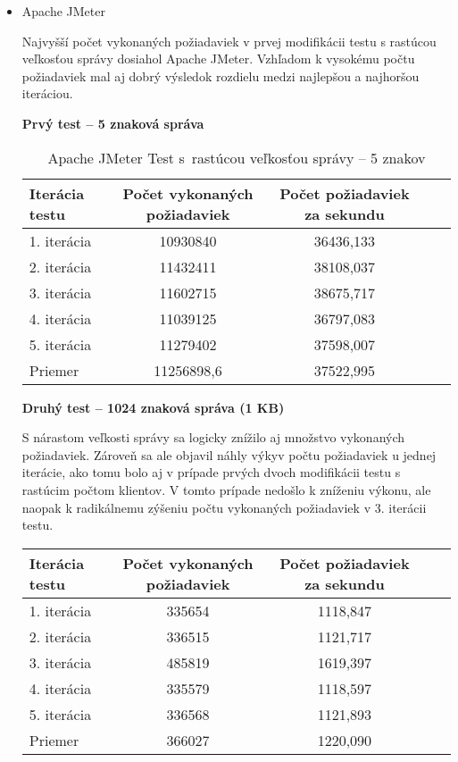 \documentclass[12pt,oneside,final]{fithesis-utf8}
\begin{document}
\begin{itemize}

\item Apache JMeter

Najvyšší počet vykonaných požiadaviek v prvej modifikácii testu s rastúcou veľkosťou správy dosiahol Apache JMeter. Vzhľadom k vysokému počtu požiadaviek mal aj dobrý výsledok rozdielu medzi najlepšou a najhoršou iteráciou.

\textbf{Prvý test -- 5 znaková správa}

\begin{table}[H]
\begin{center}
\begin{tabular}{ | l | c | c | c | c |}
		\hline
		 \textbf{Iterácia testu} & \textbf{Počet vykonaných požiadaviek} & \textbf{Počet požiadaviek za sekundu} \\ \hline
		 1. iterácia & 10930840 & 36436,133 \\ \hline
		 2. iterácia & 11432411 & 38108,037 \\ \hline
		 3. iterácia & 11602715 & 38675,717 \\ \hline
		 4. iterácia & 11039125 & 36797,083 \\ \hline
		 5. iterácia & 11279402 & 37598,007 \\ \hline
		 Priemer & 11256898,6 & 37522,995 \\ \hline
		 
\end{tabular}
\end{center}
\caption{Apache JMeter Test s~rastúcou veľkosťou správy -- 5 znakov}
\end{table}


\textbf{Druhý test -- 1024 znaková správa (1 KB)}

S nárastom veľkosti správy sa logicky znížilo aj množstvo vykonaných požiadaviek. Zároveň sa ale objavil náhly výkyv počtu požiadaviek u jednej iterácie, ako tomu bolo aj v prípade prvých dvoch modifikácii testu s rastúcim počtom klientov. V tomto prípade nedošlo k zníženiu výkonu, ale naopak k radikálnemu zýšeniu počtu vykonaných požiadaviek v 3. iterácii testu.

\begin{table}[H]
\begin{center}
\begin{tabular}{ | l | c | c | c | c |}
		\hline
		 \textbf{Iterácia testu} & \textbf{Počet vykonaných požiadaviek} & \textbf{Počet požiadaviek za sekundu} \\ \hline
		 1. iterácia & 335654 & 1118,847 \\ \hline
		 2. iterácia & 336515 & 1121,717 \\ \hline
		 3. iterácia & 485819 & 1619,397 \\ \hline
		 4. iterácia & 335579 & 1118,597 \\ \hline
		 5. iterácia & 336568 & 1121,893 \\ \hline
		 Priemer & 366027 & 1220,090 \\ \hline
		 

\end{tabular}
\end{center}
\end{table}
\end{itemize}
\end{document}

